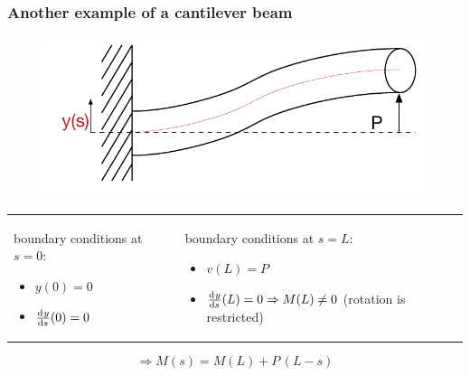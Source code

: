 \begin{frame}
  \frametitle{Another example of a cantilever beam}
  
  \begin{figure}
    \centering
    \includegraphics[width=16cm, keepaspectratio=true]{sections/traditional_beams/images/EulerCanitleverExample2}
  \end{figure}
  
  \begin{tabularx}{\linewidth}{XX}
    {
      boundary conditions at $s=0$:
      \begin{itemize}
        \item $y(0) = 0$
        \item $\od{y}{s}(0) = 0$
      \end{itemize}
    } & {
      boundary conditions at $s=L$:
      \begin{itemize}
        \item $v(L) = P$
        \item $\od{y}{s}(L) = 0 \Rightarrow M(L) \neq 0$ \newline
          \null \quad (rotation is restricted)
      \end{itemize}
    }
  \end{tabularx}
  
  \begin{displaymath}
    \Rightarrow M(s) = M(L) + P \, (L-s)
  \end{displaymath}
\end{frame}


